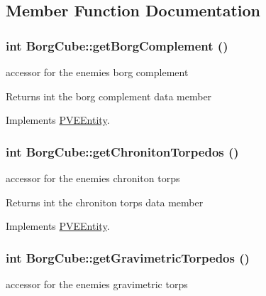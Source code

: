 \subsection{Member Function Documentation}
\hypertarget{classBorgCube_a971df059540d40c2fbf69116c6ea991f}{
\subsubsection[{getBorgComplement}]{\setlength{\rightskip}{0pt plus 5cm}int BorgCube::getBorgComplement ()}}
\label{d2/d93/classBorgCube_a971df059540d40c2fbf69116c6ea991f}
accessor for the enemies borg complement

\begin{DoxyReturn}{Returns}
int the borg complement data member 
\end{DoxyReturn}


Implements \hyperlink{classPVEEntity}{PVEEntity}.

\hypertarget{classBorgCube_a46efbcd3dfc7483c0373bf23d94179ba}{
\subsubsection[{getChronitonTorpedos}]{\setlength{\rightskip}{0pt plus 5cm}int BorgCube::getChronitonTorpedos ()}}
\label{d2/d93/classBorgCube_a46efbcd3dfc7483c0373bf23d94179ba}
accessor for the enemies chroniton torps

\begin{DoxyReturn}{Returns}
int the chroniton torps data member 
\end{DoxyReturn}


Implements \hyperlink{classPVEEntity}{PVEEntity}.

\hypertarget{classBorgCube_adf64a078b71330e27fe3074c5a278428}{
\subsubsection[{getGravimetricTorpedos}]{\setlength{\rightskip}{0pt plus 5cm}int BorgCube::getGravimetricTorpedos ()}}
\label{d2/d93/classBorgCube_adf64a078b71330e27fe3074c5a278428}
accessor for the enemies gravimetric torps

